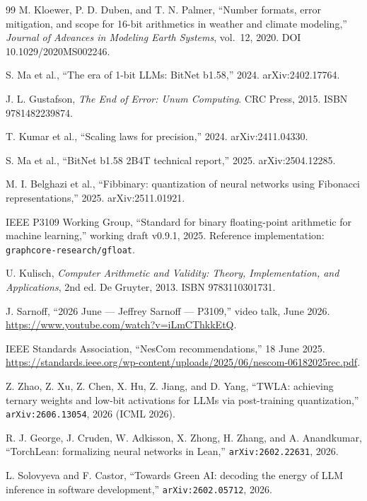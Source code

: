 \documentclass[11pt,a4paper]{article}
\theoremstyle{plain}
\begin{document}
\begin{thebibliography}{99}
 M. Kloewer, P. D. Duben, and T. N. Palmer, ``Number
formats, error mitigation, and scope for 16-bit arithmetics in weather and
climate modeling,'' \emph{Journal of Advances in Modeling Earth Systems},
vol.~12, 2020. DOI 10.1029/2020MS002246.

 S. Ma et al., ``The era of 1-bit LLMs: BitNet b1.58,''
2024. arXiv:2402.17764.

 J. L. Gustafson, \emph{The End of Error:
Unum Computing}. CRC Press, 2015. ISBN 9781482239874.

 T. Kumar et al., ``Scaling laws for precision,''
2024. arXiv:2411.04330.

 S. Ma et al., ``BitNet b1.58 2B4T technical
report,'' 2025. arXiv:2504.12285.

 M. I. Belghazi et al., ``Fibbinary: quantization
of neural networks using Fibonacci representations,'' 2025.
arXiv:2511.01921.

 IEEE P3109 Working Group, ``Standard for binary
floating-point arithmetic for machine learning,'' working draft v0.9.1, 2025.
Reference implementation: \texttt{graphcore-research/gfloat}.

 U. Kulisch, \emph{Computer Arithmetic and Validity:
Theory, Implementation, and Applications}, 2nd ed. De Gruyter, 2013.
ISBN 9783110301731.

 J. Sarnoff, ``2026 June --- Jeffrey Sarnoff --- P3109,''
video talk, June 2026. \url{https://www.youtube.com/watch?v=iLmCThkkEtQ}.

 IEEE Standards Association, ``NesCom recommendations,''
18 June 2025.
\url{https://standards.ieee.org/wp-content/uploads/2025/06/nescom-06182025rec.pdf}.

 Z. Zhao, Z. Xu, Z. Chen, X. Hu, Z. Jiang, and D. Yang,
``TWLA: achieving ternary weights and low-bit activations for LLMs via
post-training quantization,'' \texttt{arXiv:2606.13054}, 2026 (ICML 2026).

 R. J. George, J. Cruden, W. Adkisson, X. Zhong,
H. Zhang, and A. Anandkumar, ``TorchLean: formalizing neural networks in
Lean,'' \texttt{arXiv:2602.22631}, 2026.

 L. Solovyeva and F. Castor, ``Towards Green AI:
decoding the energy of LLM inference in software development,''
\texttt{arXiv:2602.05712}, 2026.


\end{thebibliography}
\end{document}
